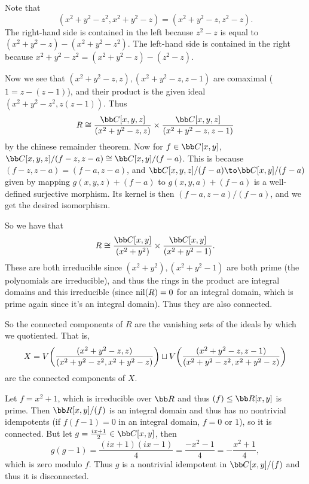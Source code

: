         \item Note that
        $$ (x^2+y^2-z^2,x^2+y^2-z) = (x^2+y^2-z,z^2-z) . $$
        The right-hand side is contained in the left because $z^2-z$ is equal to $(x^2+y^2-z)-(x^2+y^2-z^2)$.
        The left-hand side is contained in the right because $x^2+y^2-z^2=(x^2+y^2-z)-(z^2-z)$.

        Now we see that $(x^2+y^2-z,z),(x^2+y^2-z,z-1)$ are comaximal ($1=z-(z-1)$), and their product is the given ideal $(x^2+y^2-z^2,z(z-1))$.
        Thus
        $$ R \cong \frac{\bC[x,y,z]}{(x^2+y^2-z,z)} \times \frac{\bC[x,y,z]}{(x^2+y^2-z,z-1)} $$
        by the chinese remainder theorem.
        Now for $f\in\bC[x,y]$, $\bC[x,y,z]/(f-z,z-a)\cong\bC[x,y]/(f-a)$.
        This is because $(f-z,z-a)=(f-a,z-a)$, and $\bC[x,y,z]/(f-a)\to\bC[x,y]/(f-a)$ given by mapping $g(x,y,z)+(f-a)$ to $g(x,y,a)+(f-a)$ is a well-defined surjective morphism.
        Its kernel is then $(f-a,z-a)/(f-a)$, and we get the desired isomorphism.

        So we have that
        $$ R \cong \frac{\bC[x,y]}{(x^2+y^2)} \times \frac{\bC[x,y]}{(x^2+y^2-1)} . $$
        These are both irreducible since $(x^2+y^2),(x^2+y^2-1)$ are both prime (the polynomials are irreducible), and thus the rings in the product are integral domains and this irreducible
        (since ${\rm nil}(R)=0$ for an integral domain, which is prime again since it's an integral domain).
        Thus they are also connected.

        So the connected components of $R$ are the vanishing sets of the ideals by which we quotiented.
        That is,
        $$ X = V\mathopen{}\mathclose{\left({{(x^2+y^2-z,z)}\over{(x^2+y^2-z^2,x^2+y^2-z)}}\right)} \sqcup V\mathopen{}\mathclose{\left({{(x^2+y^2-z,z-1)}\over{(x^2+y^2-z^2,x^2+y^2-z)}}\right)} $$
        are the connected components of $X$.
    \eenum

    \item Let $f=x^2+1$, which is irreducible over $\bR$ and thus $(f)\leq\bR[x,y]$ is prime.
    Then $\bR[x,y]/(f)$ is an integral domain and thus has no nontrivial idempotents (if $f(f-1)=0$ in an integral domain, $f=0$ or $1$), so it is connected.
    But let $g=\frac{ix+1}2\in\bC[x,y]$, then
    $$ g(g-1) = \frac{(ix+1)(ix-1)}4 = \frac{-x^2-1}4 = - \frac{x^2+1}4 , $$
    which is zero modulo $f$.
    Thus $g$ is a nontrivial idempotent in $\bC[x,y]/(f)$ and thus it is disconnected.
\eenum

\bprob

